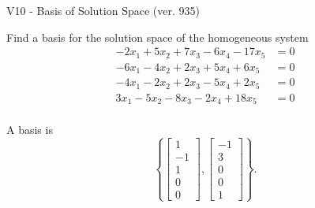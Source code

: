 \begin{exercise}
  \begin{exerciseTitle}V10 - Basis of Solution Space (ver. 935)\end{exerciseTitle}
  \begin{exerciseStatement}
    Find a basis for the solution space of the homogeneous system 
\begin{align*}
 -2 x_ 1 + 5 x_ 2 + 7 x_ 3 -6 x_ 4 -17 x_ 5 &= 0  \\ 
  -6 x_ 1 -4 x_ 2 + 2 x_ 3 + 5 x_ 4 + 6 x_ 5 &= 0  \\ 
  -4 x_ 1 -2 x_ 2 + 2 x_ 3 -5 x_ 4 + 2 x_ 5 &= 0  \\ 
  3 x_ 1 -5 x_ 2 -8 x_ 3 -2 x_ 4 + 18 x_ 5 &= 0  \\ 
 \end{align*}


 
  \end{exerciseStatement}

  \begin{exerciseAnswer}
   A basis is   
\[\left\{\left[\begin{array}{c}
1 \\
-1 \\
1 \\
0 \\
0
\end{array}\right] , \left[\begin{array}{c}
-1 \\
3 \\
0 \\
0 \\
1
\end{array}\right]\right\}.\]

  


  \end{exerciseAnswer}
\end{exercise}